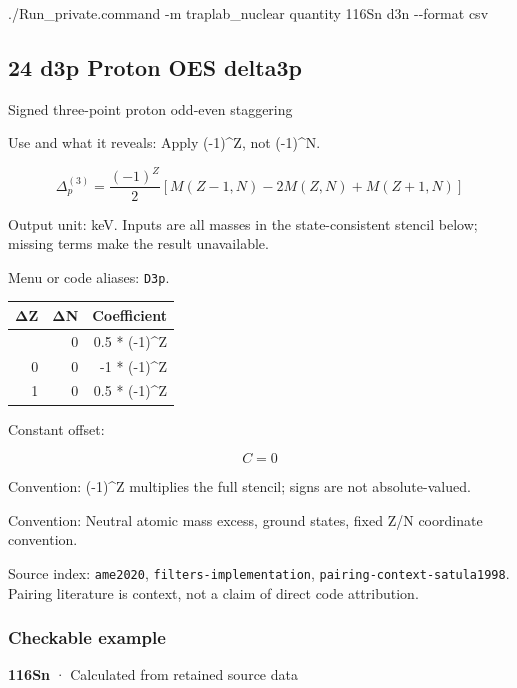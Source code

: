 \documentclass[
  11pt,
  letterpaper,
]{article}
\newenvironment{Shaded}{}{}
\newcommand{\AttributeTok}[1]{\textcolor[rgb]{0.49,0.56,0.16}{#1}}
\newcommand{\ExtensionTok}[1]{#1}
\newcommand{\NormalTok}[1]{#1}
\begin{document}
\begin{Shaded}
\begin{Highlighting}[]
\ExtensionTok{./Run\_private.command} \AttributeTok{{-}m}\NormalTok{ traplab\_nuclear quantity 116Sn d3n }\AttributeTok{{-}{-}format}\NormalTok{ csv}
\end{Highlighting}
\end{Shaded}

\subsection{24 d3p Proton OES delta3p}\label{d3p-proton-oes-delta3p}

Signed three-point proton odd-even staggering

Use and what it reveals: Apply (-1)\^{}Z, not (-1)\^{}N.

\[
\Delta_p^{(3)}=\frac{(-1)^Z}{2}[M(Z-1,N)-2M(Z,N)+M(Z+1,N)]
\]

Output unit: keV. Inputs are all masses in the state-consistent stencil
below; missing terms make the result unavailable.

Menu or code aliases: \texttt{D3p}.

\begin{longtable}[]{@{}rrr@{}}
\toprule\noalign{}
ΔZ & ΔN & Coefficient \\
\midrule\noalign{}
\endhead
\bottomrule\noalign{}
\endlastfoot
-1 & 0 & 0.5 * (-1)\^{}Z \\
0 & 0 & -1 * (-1)\^{}Z \\
1 & 0 & 0.5 * (-1)\^{}Z \\
\end{longtable}

Constant offset:

\[
C=0
\]

Convention: (-1)\^{}Z multiplies the full stencil; signs are not
absolute-valued.

Convention: Neutral atomic mass excess, ground states, fixed Z/N
coordinate convention.

Source index: \texttt{ame2020}, \texttt{filters-implementation},
\texttt{pairing-context-satula1998}. Pairing literature is context, not
a claim of direct code attribution.

\subsubsection{Checkable example}\label{checkable-example-23}

\textbf{116Sn} · Calculated from retained source data
\end{document}
